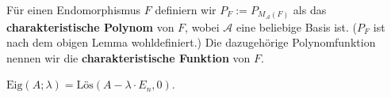 \begin{definition} Für einen Endomorphismus $F$ definiern wir $P_F :=
P_{M_\mathcal{A}(F)}$ als das \textbf{charakteristische Polynom} von $F$, wobei
$\mathcal{A}$ eine beliebige Basis ist. ($P_F$ ist nach dem obigen Lemma
wohldefiniert.) Die dazugehörige Polynomfunktion nennen wir die \textbf{
charakteristische Funktion} von $F$.
\end{definition}

\begin{bemerkung} $\text{Eig}(A;\lambda) =\text{Lös}(A - \lambda \cdot E_n, 0)$.
\end{bemerkung}

